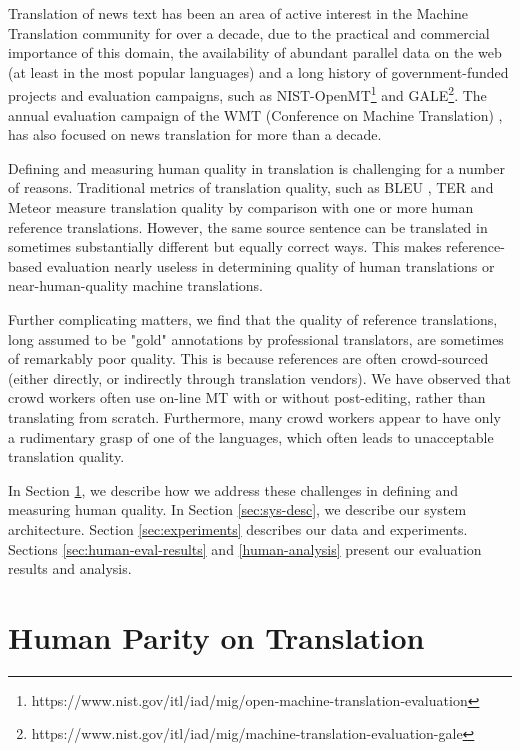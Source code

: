 \documentclass[a4paper]{article}
\begin{document}
\begin{CJK*}{UTF8}{gbsn}
Translation of news text has been an area of active interest in the Machine Translation community for over a decade, due to the practical and commercial importance of this domain, the availability of abundant parallel data on the web (at least in the most popular languages) and a long history of government-funded projects and evaluation campaigns, such as NIST-OpenMT\footnote{https://www.nist.gov/itl/iad/mig/open-machine-translation-evaluation} and GALE\footnote{https://www.nist.gov/itl/iad/mig/machine-translation-evaluation-gale}. The annual evaluation campaign of the WMT (Conference on Machine Translation) \cite{bojar-EtAl:2017:WMT1}, has also focused on news translation for more than a decade.

Defining and measuring human quality in translation is challenging for a number of reasons. Traditional metrics of translation quality, such as BLEU \cite{papineni2002bleu}, TER \cite{snover2006study} and Meteor \cite{denkowskimeteor2011} measure translation quality by comparison with one or more human reference translations. However, the same source sentence can be translated in sometimes substantially different but equally correct ways.  This makes reference-based evaluation nearly useless in determining quality of human translations or near-human-quality machine translations. 

Further complicating matters, we find that the quality of reference translations, long assumed to be "gold" annotations by professional translators, are sometimes of remarkably poor quality. This is because references are often crowd-sourced (either directly, or indirectly through translation vendors). We have observed that crowd workers often use on-line MT with or without post-editing, rather than translating from scratch. Furthermore, many crowd workers appear to have only a rudimentary grasp of one of the languages, which often leads to unacceptable translation quality.

In Section \ref{sec:human-parity}, we describe how we address these challenges in defining and measuring human quality. In Section \ref{sec:sys-desc}, we describe our system architecture. Section \ref{sec:experiments} describes our data and experiments. Sections \ref{sec:human-eval-results} and \ref{human-analysis} present our evaluation results and analysis.  
 \section{Human Parity on Translation}
\label{sec:human-parity}


\end{CJK*}
\end{document}

